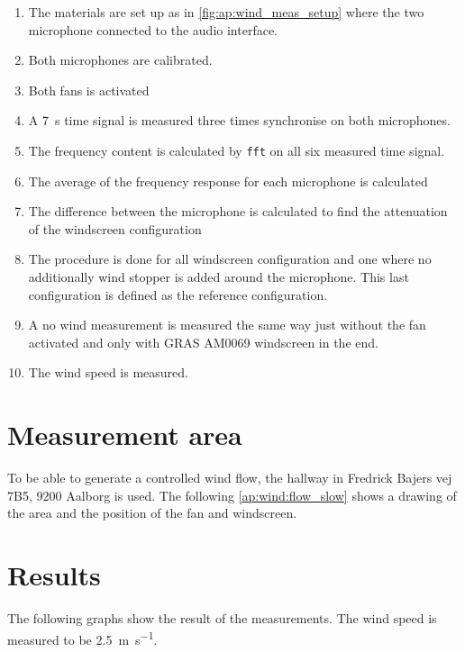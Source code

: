 \begin{enumerate}
\item The materials are set up as in \autoref{fig:ap:wind_meas_setup} where the two microphone connected to the audio interface.
\item Both microphones are calibrated.
\item Both fans is activated 
\item A \SI{7}{\second} time signal is measured three times synchronise on both microphones.
\item The frequency content is calculated by \texttt{fft} on all six measured time signal.
\item The average of the frequency response for each microphone is calculated
\item The difference between the microphone is calculated to find the attenuation of the windscreen configuration
\item The procedure is done for all windscreen configuration and one where no additionally wind stopper is added around the microphone. This last configuration is defined as the reference configuration.
\item A no wind measurement is measured the same way just without the fan activated and only with GRAS AM0069 windscreen in the end.
\item The wind speed is measured.
\end{enumerate}

\section*{Measurement area}
To be able to generate a controlled wind flow, the hallway in Fredrick Bajers vej 7B5, 9200 Aalborg is used. The following \autoref{ap:wind:flow_slow} shows a drawing of the area and the position of the fan and windscreen.


\section*{Results}
The following graphs show the result of the measurements. The wind speed is measured to be \SI{2.5}{\meter\per\second}. 



